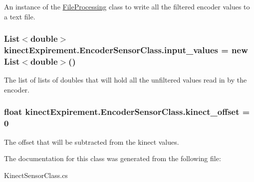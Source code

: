 An instance of the {\ttfamily \hyperlink{classkinect_expirement_1_1_file_processing}{File\+Processing}} class to write all the filtered encoder values to a text file. 

\subsubsection[{\texorpdfstring{input\+\_\+values}{input_values}}]{\setlength{\rightskip}{0pt plus 5cm}List$<$double$>$ kinect\+Expirement.\+Encoder\+Sensor\+Class.\+input\+\_\+values = new List$<$double$>$()}\hypertarget{classkinect_expirement_1_1_encoder_sensor_class_ae6c3bb0efe3e841b985741bfa35dc8aa}{}\label{classkinect_expirement_1_1_encoder_sensor_class_ae6c3bb0efe3e841b985741bfa35dc8aa}


The list of lists of doubles that will hold all the unfiltered values read in by the encoder. 

\subsubsection[{\texorpdfstring{kinect\+\_\+offset}{kinect_offset}}]{\setlength{\rightskip}{0pt plus 5cm}float kinect\+Expirement.\+Encoder\+Sensor\+Class.\+kinect\+\_\+offset = 0}\hypertarget{classkinect_expirement_1_1_encoder_sensor_class_a70bb049741404bcfcce7e78a43739e33}{}\label{classkinect_expirement_1_1_encoder_sensor_class_a70bb049741404bcfcce7e78a43739e33}


The offset that will be subtracted from the kinect values. 



The documentation for this class was generated from the following file\+:\begin{DoxyCompactItemize}
\item 
Kinect\+Sensor\+Class.\+cs\end{DoxyCompactItemize}
